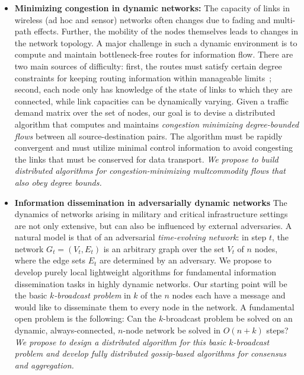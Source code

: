 \begin{itemize}
\item
{\bf Minimizing congestion in dynamic networks:} The capacity of links
in wireless (ad hoc and sensor) networks often changes due to fading
and multi-path effects.  Further, the mobility of the nodes themselves
leads to changes in the network topology.  A major challenge in such a
dynamic environment is to compute and maintain bottleneck-free routes
for information flow.  There are two main sources of difficulty:
first, the routes must satisfy certain degree constraints for
keeping routing information within manageable limits~\cite{chen+rs:flow};
second, each node only has knowledge of the state of links to which
they are connected, while link capacities can be dynamically varying.
Given a traffic demand matrix over the set of nodes, our goal is to
devise a distributed algorithm that computes and maintains {\em
congestion minimizing degree-bounded flows}\/ between all
source-destination pairs.  The algorithm must be rapidly convergent
and must utilize minimal control information to avoid congesting the
links that must be conserved for data transport. {\em We propose to build distributed algorithms for congestion-minimizing multcommodity flows that also obey degree bounds.}

\item
{\bf Information dissemination in adversarially dynamic networks} The
dynamics of networks arising in military and critical infrastructure
settings are not only extensive, but can also be influenced by
external adversaries.  A natural model is that of an adversarial {\em
  time-evolving network}: in step $t$, the network $G_t = (V_t, E_t)$
is an arbitrary graph over the set $V_t$ of $n$ nodes, where the edge
sets $E_t$ are determined by an adversary.  We propose to develop
purely local lightweight algorithms for fundamental information
dissemination tasks in highly dynamic networks.  Our starting point
will be the basic {\em $k$-broadcast problem} in $k$ of the $n$ nodes
each have a message and would like to disseminate them to every node
in the network.  A fundamental open problem is the following: Can the
$k$-broadcast problem be solved on an dynamic, always-connected,
$n$-node network be solved in $O(n + k)$ steps? {\em We propose to design a distributed algorithm for this basic $k$-broadcast problem and develop fully distributed gossip-based algorithms for
consensus and aggregation.}


\end{itemize}

